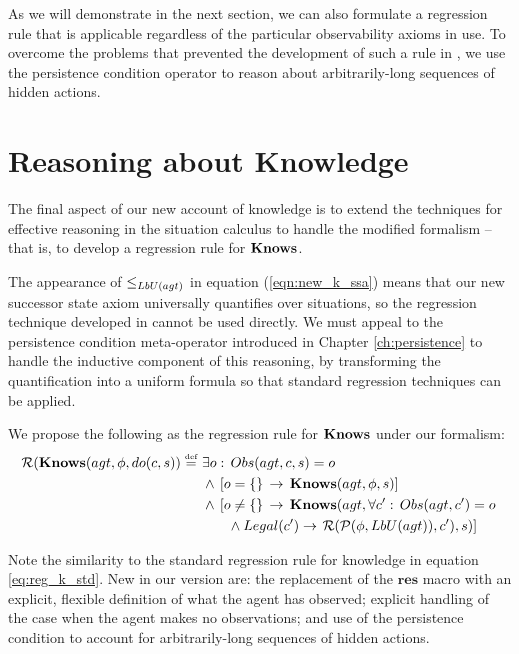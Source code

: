 As we will demonstrate in the next section, we can also formulate
a regression rule that is applicable regardless of the particular
observability axioms in use. To overcome the problems that prevented
the development of such a rule in \citep{Lesperance99sitcalc_approach},
we use the persistence condition operator to reason about arbitrarily-long
sequences of hidden actions.


\section{Reasoning about Knowledge\label{sec:Knowledge:Regression}}

The final aspect of our new account of knowledge is to extend the
techniques for effective reasoning in the situation calculus to handle
the modified formalism -- that is, to develop a regression rule for
$\mathbf{Knows}$.

The appearance of $\leq_{LbU(agt)}$ in equation (\ref{eqn:new_k_ssa})
means that our new successor state axiom universally quantifies over
situations, so the regression technique developed in \citep{scherl03sc_knowledge}
cannot be used directly. We must appeal to the persistence condition
meta-operator introduced in Chapter \ref{ch:persistence} to handle
the inductive component of this reasoning, by transforming the quantification
into a uniform formula so that standard regression techniques can
be applied.

We propose the following as the regression rule for $\mathbf{Knows}$ under
our formalism:\begin{align}
\mathcal{R}(\mathbf{Knows}(agt,\phi,do(c,s))\stackrel{\mbox{\tiny def}}{=}\,\, & \exists o:\, Obs(agt,c,s)=o\nonumber \\
 & \wedge\,\left[o=\{\}\,\rightarrow\,\mathbf{Knows}(agt,\phi,s)\right]\nonumber \\
 & \wedge\,\left[o\neq\{\}\,\rightarrow\,\mathbf{Knows}(agt,\forall c':\, Obs(agt,c')=o\right.\nonumber \\
 & \,\,\,\,\,\,\,\,\,\,\,\wedge Legal(c')\rightarrow\left.\mathcal{R}(\mathcal{P}(\phi,LbU(agt)),c'),s)\right]\label{eqn:R_do_c_s}\end{align}


Note the similarity to the standard regression rule for knowledge
in equation \eqref{eq:reg_k_std}. New in our version are: the replacement
of the $\mathbf{res}$ macro with an explicit, flexible definition
of what the agent has observed; explicit handling of the case when
the agent makes no observations; and use of the persistence condition
to account for arbitrarily-long sequences of hidden actions.

